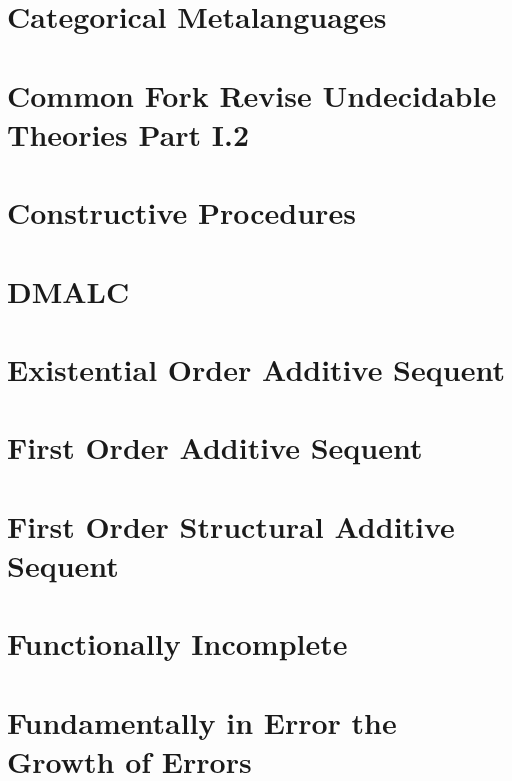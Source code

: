 \documentclass{report}
\begin{document}
\chapter{Categorical Metalanguages}

\chapter{Common Fork Revise Undecidable Theories Part I.2}

\chapter{Constructive Procedures}

\chapter{DMALC}

\chapter{Existential Order Additive Sequent}

\chapter{First Order Additive Sequent}

\chapter{First Order Structural Additive Sequent}

\chapter{Functionally Incomplete}

\chapter{Fundamentally in Error the Growth of Errors}
\end{document}

